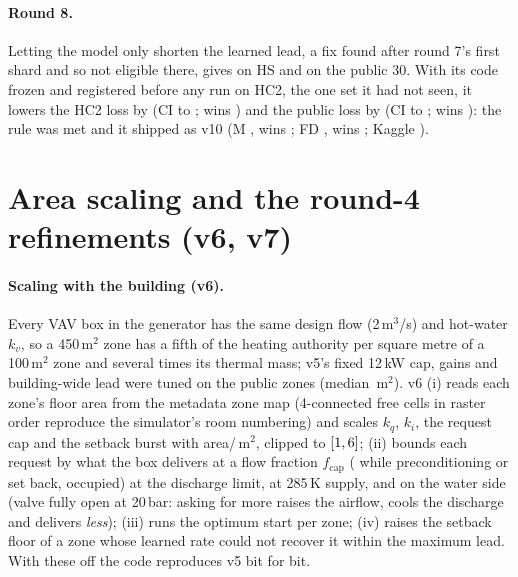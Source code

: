 \documentclass{article}
\begin{document}
\paragraph{Round 8.}
Letting the model only shorten the learned lead, a fix found after round 7's first shard and so not eligible there,
gives \RSevLedgerHsRel{} on HS and \RSevLedgerPubRel{} on the public 30. With its code frozen and registered before any
run on HC2, the one set it had not seen, it lowers the HC2 loss by \REigConfHarshCTwoRelAbs{} (CI
\REigConfHarshCTwoRelHiAbs{} to \REigConfHarshCTwoRelLoAbs; wins \REigConfHarshCTwoWins) and the public loss by
\REigConfPubRelAbs{} (CI \REigConfPubRelHiAbs{} to \REigConfPubRelLoAbs; wins \REigConfPubWins): the rule was met
and it shipped as v10 (M \REigConfMinnRel, wins \REigConfMinnWins; FD \REigConfFreshDefRel, wins
\REigConfFreshDefWins; Kaggle \REigKagVTen).

\section{Area scaling and the round-4 refinements (v6, v7)}
\label{app:versions}

\paragraph{Scaling with the building (v6).}
Every VAV box in the generator has the same design flow (2\,m$^3$/s) and hot-water $k_v$, so
a 450\,m$^2$ zone has a fifth of the heating authority per square metre of a 100\,m$^2$ zone
and several times its thermal mass; v5's fixed 12\,kW cap, gains and building-wide lead were
tuned on the public zones (median \PubZoneAreaMedian\,m$^2$). v6 (i) reads each zone's floor
area from the metadata zone map (4-connected free cells in raster order reproduce the
simulator's room numbering) and scales $k_q$, $k_i$, the request cap and the setback burst with
area/\ParAreaRef\,m$^2$, clipped to $[1, 6]$; (ii) bounds each
request by what the box delivers at a flow fraction $f_{\text{cap}}$ (\VSixFCapPre{} while
preconditioning or set back, \ParFCapOcc{} occupied) at the discharge limit, at 285\,K supply,
and on the water side (valve fully open at 20\,bar: asking for more raises the airflow, cools
the discharge and delivers \emph{less}); (iii) runs the optimum start per zone; (iv) raises the
setback floor of a zone whose learned rate could not recover it within the maximum lead. With
these off the code reproduces v5 bit for bit.
\end{document}
